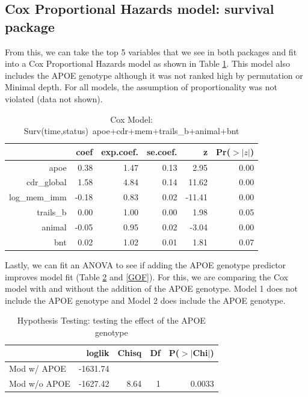 \documentclass[a4paper,man,natbib,11pt]{article}
\begin{document}
\subsection{Cox Proportional Hazards model: survival package}

From this, we can take the top 5 variables that we see in both packages and fit into a Cox Proportional Hazards model as shown in Table \ref{cox_coef}. This model also includes the APOE genotype although it was not ranked high by permutation or Minimal depth. For all models, the assumption of proportionality was not violated (data not shown).   

\begin{table}[ht]
\centering
\caption{Cox Model: Surv(time,status)~apoe+cdr+mem+trails\_b+animal+bnt}
\begin{tabular}{rrrrrr}
  \hline
 & coef & exp.coef. & se.coef. & z & Pr($>$$|z|$) \\ 
  \hline
apoe & 0.38 & 1.47 & 0.13 & 2.95 & 0.00 \\ 
  cdr\_global & 1.58 & 4.84 & 0.14 & 11.62 & 0.00 \\ 
  log\_mem\_imm & -0.18 & 0.83 & 0.02 & -11.41 & 0.00 \\ 
  trails\_b & 0.00 & 1.00 & 0.00 & 1.98 & 0.05 \\ 
  animal & -0.05 & 0.95 & 0.02 & -3.04 & 0.00 \\ 
  bnt & 0.02 & 1.02 & 0.01 & 1.81 & 0.07 \\ 
   \hline
\end{tabular}
\label{cox_coef}
\end{table}


Lastly, we can fit an ANOVA to see if adding the APOE genotype predictor improves model fit (Table \ref{anova} and \ref{GOF}). For this, we are comparing the Cox model with and without the addition of the APOE genotype. Model 1 does not include the APOE genotype and Model 2 does include the APOE genotype. 

\begin{table}[ht]
\centering
\caption{Hypothesis Testing: testing the effect of the APOE genotype}
\begin{tabular}{lrrrr}
  \hline
 & loglik & Chisq & Df & P($>$$|$Chi$|$) \\ 
  \hline
Mod w/ APOE & -1631.74 &  &  &  \\ 
  Mod w/o APOE & -1627.42 & 8.64 & 1 & 0.0033 \\ 
   \hline
\end{tabular}
\label{anova}
\end{table}
\end{document}
